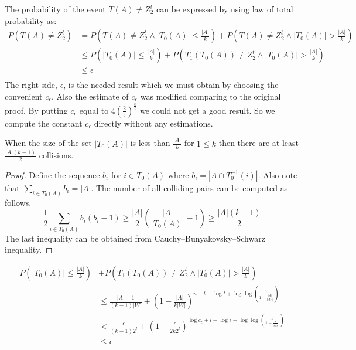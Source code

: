 The probability of the event $T(A) \neq Z_2^t$ can be expressed by using law of total probability as:
\begin{displaymath}
\begin{split}
P(T(A) \neq Z_2^t) 
    & = P(T(A) \neq Z_2^t \wedge |T_0(A)| \leq \frac{|A|}{k}) + P(T(A) \neq Z_2^t \wedge |T_0(A)| > \frac{|A|}{k}) \\ 
    & \leq P(|T_0(A)| \leq \frac{|A|}{k}) + P(T_1(T_0(A)) \neq Z_2^t \wedge |T_0(A)| > \frac{|A|}{k}) \\
    & \leq \epsilon \\
\end{split}
\end{displaymath}
The right side, $\epsilon$, is the needed result which we must obtain by choosing the convenient $c_{\epsilon}$. Also the estimate of $c_{\epsilon}$ was modified comparing to the original proof. By putting $c_{\epsilon}$ equal to $4\left(\frac{2}{\epsilon}\right)^{\frac{8}{\epsilon}}$ we could not get a good result. So we compute the constant $c_{\epsilon}$ directly without any estimations.

\begin{lemma}
\label{lemma-collision-count}
When the size of the set $|T_0(A)|$ is less than $\frac{|A|}{k}$ for $1 \leq k$ then there are at least $\frac{|A|(k - 1)}{2}$ collisions.
\end{lemma} 
\begin{proof}
Define the sequence $b_i$ for $i \in T_0(A)$ where $b_i = \left|A \cap T_0^{-1}(i)\right|$. Also note that $\sum_{i \in T_0(A)} b_i = |A|$.
The number of all colliding pairs can be computed as follows.
\begin{displaymath}
\frac{1}{2} \sum_{i \in T_0(A)} b_i (b_i - 1) \geq \frac{|A|}{2}\left(\frac{|A|}{|T_0(A)|} - 1\right) \geq \frac{|A|(k - 1)}{2}
\end{displaymath}
The last inequality can be obtained from Cauchy–Bunyakovsky–Schwarz inequality.
\end{proof}

\begin{displaymath}
\begin{split}
P(|T_0(A)| \leq \frac{|A|}{k}) & + P(T_1(T_0(A)) \neq Z_2^t \wedge |T_0(A)| > \frac{|A|}{k}) \\ 
& \leq \frac{|A| - 1}{(k - 1)|W|} + \left(1 - \frac{|A|}{k|W|}\right)^{u - t - \log t + \log \log \left(\frac{1}{1 - \frac{|A|}{k|W|}}\right)} \\
& < \frac{\epsilon}{(k - 1) 2 ^ l} + \left(1 - \frac{\epsilon}{2 k 2^l}\right)^{\log c_\epsilon + l - \log \epsilon + \log \log \left(\frac{1}{1 - \frac{\epsilon}{2 k 2^l}}\right)} \\
& \leq \epsilon \\
\end{split}
\end{displaymath}

